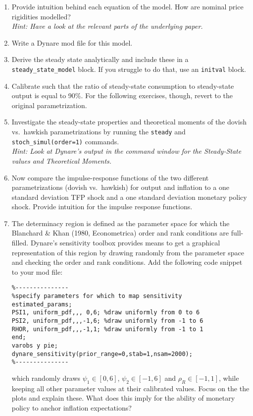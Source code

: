 \documentclass{article}
\begin{document}
\begin{enumerate}

\item
Provide intuition behind each equation of the model. How are nominal price rigidities modelled?\\\emph{Hint: Have a look at the relevant parts of the underlying paper.}

\item
Write a Dynare mod file for this model.

\item
Derive the steady state analytically and include these in a {\texttt{steady{\_}state{\_}model}} block.
If you struggle to do that, use an \texttt{initval} block.

\item
Calibrate such that the ratio of steady-state consumption to steady-state output is equal to 90\%.
For the following exercises, though, revert to the original parametrization.		

\item
Investigate the steady-state properties and theoretical moments of the dovish vs.\ hawkish parametrizations
  by running the \texttt{steady} and \texttt{stoch{\_}simul{(order=1)}} commands.\\
  \emph{Hint: Look at Dynare's output in the command window for the Steady-State values and Theoretical Moments.}

\item
Now compare the impulse-response functions of the two different parametrizations (dovish vs.\ hawkish) for output and inflation
  to a one standard deviation TFP shock and a one standard deviation monetary policy shock.
Provide intuition for the impulse response functions.

\item
The determinacy region is defined as the parameter space for which the Blanchard \& Khan (1980, Econometrica) order and rank conditions are full-filled.
Dynare's sensitivity toolbox provides means to get a graphical representation of this region by drawing randomly from the parameter space and checking the order and rank conditions.
Add the following code snippet to your mod file:
\begin{verbatim}
%---------------
%specify parameters for which to map sensitivity
estimated_params;
PSI1, uniform_pdf,,, 0,6; %draw uniformly from 0 to 6
PSI2, uniform_pdf,,,-1,6; %draw uniformly from -1 to 6
RHOR, uniform_pdf,,,-1,1; %draw uniformly from -1 to 1
end;
varobs y pie;
dynare_sensitivity(prior_range=0,stab=1,nsam=2000);
%---------------
\end{verbatim}	
which randomly draws \(\psi_1 \in [0,6]\), \(\psi_2 \in [-1,6]\) and \(\rho_R \in [-1,1]\), while keeping all other parameter values at their calibrated values.
Focus on the the plots and explain these.
What does this imply for the ability of monetary policy to anchor inflation expectations?


\end{enumerate}
\end{document}
